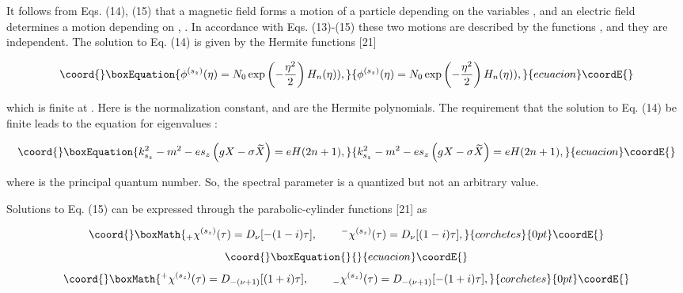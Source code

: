 \documentclass[a4paper,12pt]{article}
\begin{document}
It follows from Eqs. (14), (15) that a magnetic field \coordHE{} forms a motion of
a particle depending on the variables \coordHE{}, \coordHE{} and an electric field
determines a motion depending on \coordHE{}, \coordHE{}. In accordance with Eqs.
(13)-(15) these two motions are described by the functions \coordHE{}, \coordHE{} and they are independent. The
solution to Eq. (14) is given by the Hermite functions [21]

\begin{equation}\coord{}\boxEquation{
\phi ^{(s_z)}(\eta )=N_0\exp \left( -\frac{\eta ^2}2\right) H_n(\eta )),
\label{16}
}{
\phi ^{(s_z)}(\eta )=N_0\exp \left( -\frac{\eta ^2}2\right) H_n(\eta )),
}{ecuacion}\coordE{}\end{equation}

which is finite at \myHighlight{$\eta \rightarrow \infty $}\coordHE{}. Here \coordHE{} is the
normalization constant, and \coordHE{} are the Hermite polynomials. The
requirement that the solution to Eq. (14) be finite leads to the equation
for eigenvalues \coordHE{}:

\begin{equation}\coord{}\boxEquation{
k_{s_z}^2-m^2-es_z\left( gX-\sigma \widetilde{X}\right) =eH(2n+1),
\label{17}
}{
k_{s_z}^2-m^2-es_z\left( gX-\sigma \widetilde{X}\right) =eH(2n+1),
}{ecuacion}\coordE{}\end{equation}

where \coordHE{} is the principal quantum number. So, the spectral
parameter \coordHE{} is a quantized but not an arbitrary value.

Solutions to Eq. (15) can be expressed through the parabolic-cylinder
functions \coordHE{} [21] as

\[\coord{}\boxMath{
_{+}\chi ^{(s_z)}(\tau )=D_\nu [-(1-i)\tau ],\hspace{0.3in}^{-}\chi
^{(s_z)}(\tau )=D_\nu [(1-i)\tau ],
}{corchetes}{0pt}\coordE{}\]
\vspace{-8mm}
\begin{equation}\coord{}\boxEquation{  \label{18}
}{  }{ecuacion}\coordE{}\end{equation}
\vspace{-8mm}
\[\coord{}\boxMath{
^{+}\chi ^{(s_z)}(\tau )=D_{-(\nu+1)}[(1+i)\tau ],\hspace{0.3in}_{-}\chi
^{(s_z)}(\tau )=D_{-(\nu+1)}[-(1+i)\tau ],
}{corchetes}{0pt}\coordE{}\]
\end{document}
